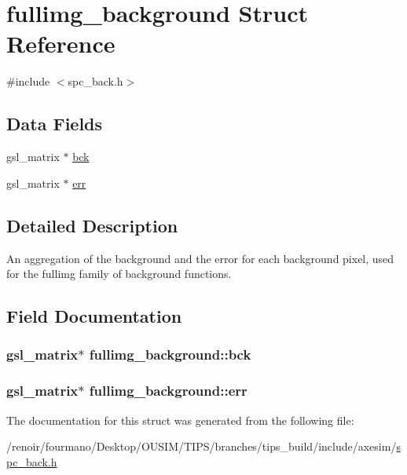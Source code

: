 \hypertarget{structfullimg__background}{
\section{fullimg\_\-background Struct Reference}
\label{structfullimg__background}
}


{\ttfamily \#include $<$spc\_\-back.h$>$}\subsection*{Data Fields}
\begin{DoxyCompactItemize}
\item 
gsl\_\-matrix $\ast$ \hyperlink{structfullimg__background_aa7b506968cfc22160ce55d63121311c4}{bck}
\item 
gsl\_\-matrix $\ast$ \hyperlink{structfullimg__background_a6c52119d1f340304f50e8f4b99ab89dc}{err}
\end{DoxyCompactItemize}


\subsection{Detailed Description}
An aggregation of the background and the error for each background pixel, used for the fullimg family of background functions. 

\subsection{Field Documentation}
\hypertarget{structfullimg__background_aa7b506968cfc22160ce55d63121311c4}{
\subsubsection[{bck}]{\setlength{\rightskip}{0pt plus 5cm}gsl\_\-matrix$\ast$ {\bf fullimg\_\-background::bck}}}
\label{structfullimg__background_aa7b506968cfc22160ce55d63121311c4}
\hypertarget{structfullimg__background_a6c52119d1f340304f50e8f4b99ab89dc}{
\subsubsection[{err}]{\setlength{\rightskip}{0pt plus 5cm}gsl\_\-matrix$\ast$ {\bf fullimg\_\-background::err}}}
\label{structfullimg__background_a6c52119d1f340304f50e8f4b99ab89dc}


The documentation for this struct was generated from the following file:\begin{DoxyCompactItemize}
\item 
/renoir/fourmano/Desktop/OUSIM/TIPS/branches/tips\_\-build/include/axesim/\hyperlink{spc__back_8h}{spc\_\-back.h}\end{DoxyCompactItemize}
